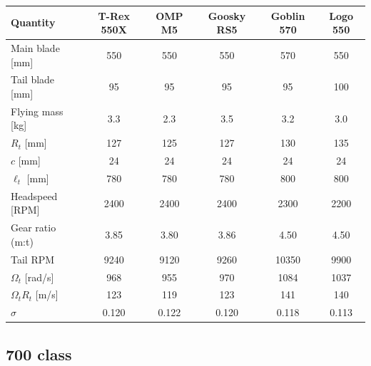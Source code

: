 \documentclass[11pt,a4paper]{article}
\newcommand{\OmegaT}{\Omega_t}
\newcommand{\Rt}{R_t}
\begin{document}
\begin{center}
\renewcommand{\arraystretch}{1.2}
\small
\begin{tabular}{lccccc}
\toprule
Quantity & T-Rex 550X & OMP M5 & Goosky RS5 & Goblin 570 & Logo 550 \\
\midrule
Main blade [mm]       & 550   & 550   & 550   & 570   & 550   \\
Tail blade [mm]       & 95    & 95    & 95    & 95    & 100   \\
Flying mass [kg]      & 3.3   & 2.3   & 3.5   & 3.2   & 3.0   \\
\(\Rt\) [mm]          & 127   & 125   & 127   & 130   & 135   \\
\(c\) [mm]            & 24    & 24    & 24    & 24    & 24    \\
\(\ell_t\) [mm]       & 780   & 780   & 780   & 800   & 800   \\
Headspeed [RPM]       & 2400  & 2400  & 2400  & 2300  & 2200  \\
Gear ratio (m:t)      & 3.85  & 3.80  & 3.86  & 4.50  & 4.50  \\
Tail RPM              & 9240  & 9120  & 9260  & 10350 & 9900  \\
\(\OmegaT\) [rad/s]   & 968   & 955   & 970   & 1084  & 1037  \\
\(\OmegaT\Rt\) [m/s]  & 123   & 119   & 123   & 141   & 140   \\
\(\sigma\)            & 0.120 & 0.122 & 0.120 & 0.118 & 0.113 \\
\bottomrule
\end{tabular}
\end{center}

\subsection{700 class}\label{app:cls700}
\end{document}
